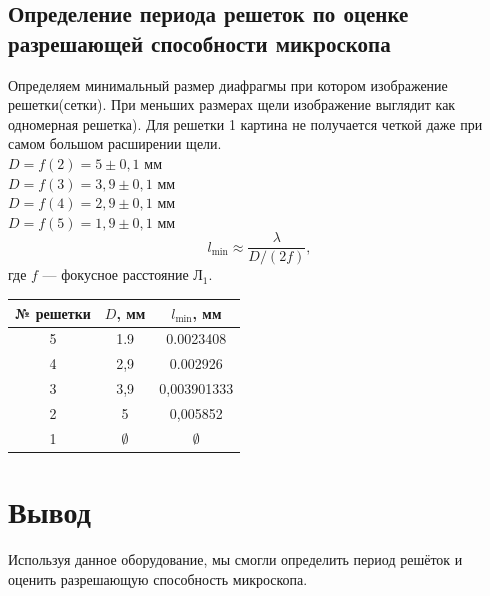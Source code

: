 \documentclass[a4paper, 12pt]{article}
\begin{document}
	\subsection{Определение периода решеток по оценке разрешающей способности микроскопа}
	Определяем минимальный размер диафрагмы при котором изображение решетки(сетки). При меньших размерах щели изображение выглядит как одномерная решетка). Для решетки 1  картина не получается четкой даже при самом большом расширении щели.\\
	$D=f(2)=5\pm0,1$ мм\\
	$D=f(3)=3,9\pm0,1$ мм\\
	$D=f(4)=2,9\pm0,1$ мм\\
	$D=f(5)=1,9\pm0,1$ мм\\
	\begin{equation*}
		l_{\min}\approx\frac{\lambda}{D/\left(2f\right)},
	\end{equation*}
	где $f$ — фокусное расстояние $\text{Л}_1$.
	\begin{table}[h]
		\centering
		\begin{tabular}{|c|c|c|}
			\hline
			№ решетки& $D$, мм & $l_{\min}$, мм\\
			\hline
			5 & 1.9 & 0.0023408\\
			4 & 2,9 & 0.002926\\
			3 & 3,9 & 0,003901333\\
			2 & 5 & 0,005852\\
			1 & $\emptyset$ & $\emptyset$\\
			\hline
		\end{tabular}
	\end{table}\par
	\newpage
	\begin{figure}
	\end{figure}
	\section{Вывод}
	Используя данное оборудование, мы смогли определить период решёток и оценить разрешающую способность микроскопа.
\end{document}
